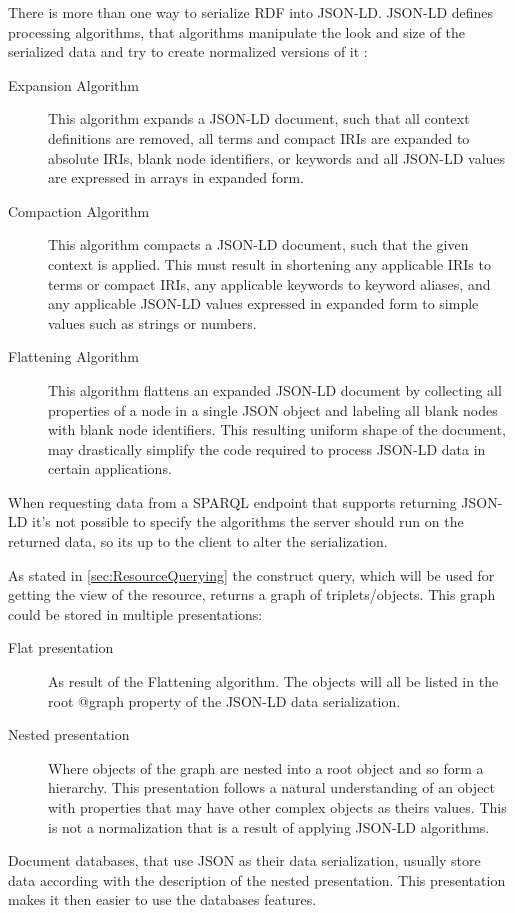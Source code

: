 There is more than one way to serialize RDF into JSON-LD. JSON-LD defines processing algorithms, that algorithms manipulate the look and size of the serialized data and try to create normalized versions of it \cite{onlineW3CJsonLdAlgorithmsSpec}:
\begin{description}
	\item[Expansion Algorithm] This algorithm expands a JSON-LD document, such that all context definitions are removed, all terms and compact IRIs are expanded to absolute IRIs, blank node identifiers, or keywords and all JSON-LD values are expressed in arrays in expanded form.
	\item[Compaction Algorithm] This algorithm compacts a JSON-LD document, such that the given context is applied. This must result in shortening any applicable IRIs to terms or compact IRIs, any applicable keywords to keyword aliases, and any applicable JSON-LD values expressed in expanded form to simple values such as strings or numbers.
	\item[Flattening Algorithm] This algorithm flattens an expanded JSON-LD document by collecting all properties of a node in a single JSON object and labeling all blank nodes with blank node identifiers. This resulting uniform shape of the document, may drastically simplify the code required to process JSON-LD data in certain applications.
\end{description}

When requesting data from a SPARQL endpoint that supports returning JSON-LD it's not possible to specify the algorithms the server should run on the returned data, so its up to the client to alter the serialization.

As stated in \autoref{sec:ResourceQuerying} the construct query, which will be used for getting the view of the resource, returns a graph of triplets/objects. This graph could be stored in multiple presentations:
\begin{description}
\item[Flat presentation] As result of the Flattening algorithm. The objects will all be listed in the root @graph property of the JSON-LD data serialization.
\item[Nested presentation] Where objects of the graph are nested into a root object and so form a hierarchy. This presentation follows a natural understanding of an object with properties that may have other complex objects as theirs values. This is not a normalization that is a result of applying JSON-LD algorithms.
\end{description}
Document databases, that use JSON as their data serialization, usually store data according with the description of the nested presentation. This presentation makes it then easier to use the databases features.

